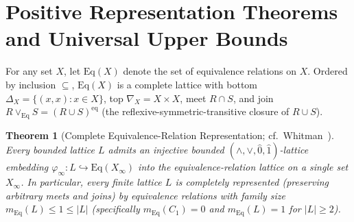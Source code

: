 \documentclass[11pt]{article}
\newtheorem{theorem}{Theorem}[section]
\theoremstyle{definition}
\theoremstyle{remark}
\newcommand{\Eq}{\mathrm{Eq}}
\begin{document}
\section{Positive Representation Theorems and Universal Upper Bounds}
\label{sec:positive}

For any set $X$, let $\Eq(X)$ denote the set of equivalence relations on $X$. Ordered by inclusion $\subseteq$, $\Eq(X)$ is a complete lattice with bottom $\Delta_X = \{(x,x) : x \in X\}$, top $\nabla_X = X \times X$, meet $R \cap S$, and join $R \vee_{\Eq} S = (R \cup S)^{\mathrm{eq}}$ (the reflexive-symmetric-transitive closure of $R \cup S$).

\begin{theorem}[Complete Equivalence-Relation Representation; cf.\ Whitman~\cite{Whitman1946}]
\label{thm:whitman}
Every bounded lattice $L$ admits an injective bounded $(\wedge, \vee, \hat{0}, \hat{1})$-lattice embedding $\varphi_\infty \colon L \hookrightarrow \Eq(X_\infty)$ into the equivalence-relation lattice on a single set $X_\infty$. In particular, every finite lattice $L$ is completely represented (preserving arbitrary meets and joins) by equivalence relations with family size $m_{\Eq}(L) \le 1 \le |L|$ (specifically $m_{\Eq}(C_1) = 0$ and $m_{\Eq}(L) = 1$ for $|L| \ge 2$).
\end{theorem}
\end{document}
